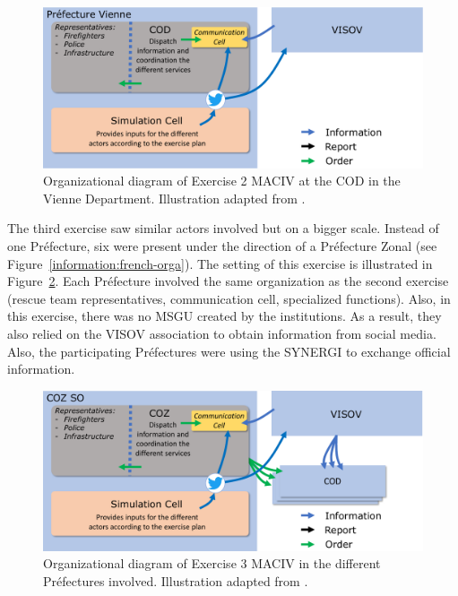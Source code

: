 \begin{figure}[htb]
    \centering
    \includegraphics[width=\textwidth]{figures/chap-3/exercice-2-setup.pdf}
    \caption{Organizational diagram of Exercise 2 MACIV at the COD in the Vienne Department. Illustration adapted from \textcite{batardIntegrerContributionsCitoyennes2021}.}
    \label{information:exercice-2-setup}
\end{figure}

The third exercise saw similar actors involved but on a bigger scale.
Instead of one Préfecture, six were present under the direction of a Préfecture Zonal (see Figure~\ref{information:french-orga}).
The setting of this exercise is illustrated in Figure~\ref{information:exercice-3-setup}.
Each Préfecture involved the same organization as the second exercise (rescue team representatives, communication cell, specialized functions).
Also, in this exercise, there was no MSGU created by the institutions.
As a result, they also relied on the VISOV association to obtain information from social media.
Also, the participating Préfectures were using the SYNERGI to exchange official information.

\begin{figure}[htb]
    \centering
    \includegraphics[width=\textwidth]{figures/chap-3/exercice-3-setup.pdf}
    \caption{Organizational diagram of Exercise 3 MACIV in the different Préfectures involved. Illustration adapted from \textcite{batardIntegrerContributionsCitoyennes2021}.}
    \label{information:exercice-3-setup}
\end{figure}

